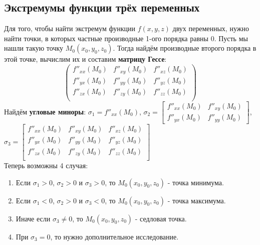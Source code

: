 \subsection{Экстремумы функции трёх переменных}
Для того, чтобы найти экстремум функции $f(x,y,z)$ двух переменных, нужно найти точки, в которых частные производные 1-ого порядка равны $0$. Пусть мы нашли такую точку $M_0(x_0,y_0,z_0)$. Тогда найдём производные второго порядка в этой точке, вычислим их и составим \textbf{матрицу Гессе}:
$$
\begin{pmatrix}
f''_{xx}(M_0) & f''_{xy}(M_0) & f''_{xz}(M_0)\\
f''_{yx}(M_0) & f''_{yy}(M_0) & f''_{yz}(M_0)\\
f''_{zx}(M_0) & f''_{zy}(M_0) & f''_{zz}(M_0)\\
\end{pmatrix}
$$
Найдём \textbf{угловые миноры}:
$\sigma_1 = f''_{xx}(M_0)$,
$\sigma_2 = 
\begin{bmatrix}
f''_{xx}(M_0) & f''_{xy}(M_0)\\
f''_{yx}(M_0) & f''_{yy}(M_0)
\end{bmatrix}$,
$
\sigma_3 = 
\begin{bmatrix}
f''_{xx}(M_0) & f''_{xy}(M_0) & f''_{xz}(M_0)\\
f''_{yx}(M_0) & f''_{yy}(M_0) & f''_{yz}(M_0)\\
f''_{zx}(M_0) & f''_{zy}(M_0) & f''_{zz}(M_0)\\
\end{bmatrix}$\\
Теперь возможны 4 случая:
\begin{enumerate}
	\item Если $\sigma_1 > 0$, $\sigma_2 > 0$ и $\sigma_3 > 0$, то $M_0(x_0,y_0,z_0)$ - точка минимума.	
	\item Если $\sigma_1 < 0$, $\sigma_2 > 0$ и $\sigma_3 < 0$, то $M_0(x_0,y_0,z_0)$ - точка максимума.	
	\item Иначе если $\sigma_3 \neq 0$, то $M_0(x_0,y_0,z_0)$ - седловая точка.	
	\item При $\sigma_3 = 0$, то нужно дополнительное исследование.	
\end{enumerate}
